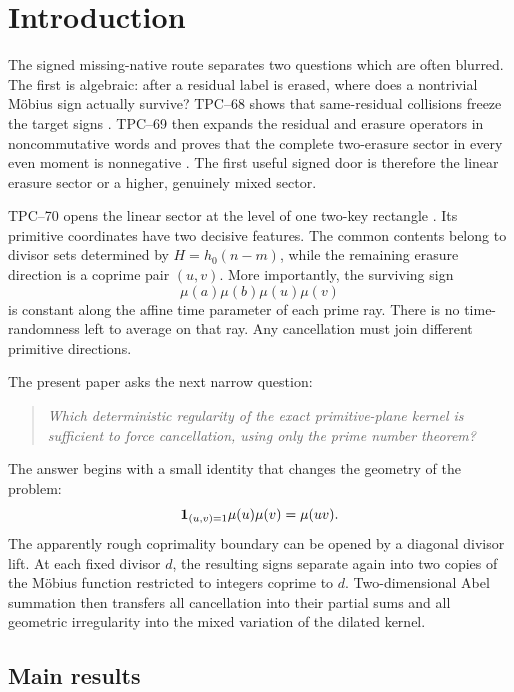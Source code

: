 \section{Introduction}
\label{sec:introduction}

The signed missing-native route separates two questions which are often
blurred.  The first is algebraic: after a residual label is erased, where
does a nontrivial M\"obius sign actually survive?  TPC--68 shows that
same-residual collisions freeze the target signs
\citep{WangTPC68}.  TPC--69 then expands the residual and erasure operators
in noncommutative words and proves that the complete two-erasure sector in
every even moment is nonnegative \citep{WangTPC69}.  The first useful signed
door is therefore the linear erasure sector or a higher, genuinely mixed
sector.

TPC--70 opens the linear sector at the level of one two-key rectangle
\citep{WangTPC70}.  Its primitive coordinates have two decisive features.
The common contents belong to divisor sets determined by
\(H=h_0(n-m)\), while the remaining erasure direction is a coprime pair
\((u,v)\).  More importantly, the surviving sign
\[
 \mu(a)\mu(b)\mu(u)\mu(v)
\]
is constant along the affine time parameter of each prime ray.  There is no
time-randomness left to average on that ray.  Any cancellation must join
different primitive directions.

The present paper asks the next narrow question:

\begin{quote}
\emph{Which deterministic regularity of the exact primitive-plane kernel is
sufficient to force cancellation, using only the prime number theorem?}
\end{quote}

The answer begins with a small identity that changes the geometry of the
problem:
\[
 \mathbf 1_{(u,v)=1}\mu(u)\mu(v)=\mu(uv).
\]
The apparently rough coprimality boundary can be opened by a diagonal
divisor lift.  At each fixed divisor \(d\), the resulting signs separate
again into two copies of the M\"obius function restricted to integers
coprime to \(d\).  Two-dimensional Abel summation then transfers all
cancellation into their partial sums and all geometric irregularity into
the mixed variation of the dilated kernel.

\subsection{Main results}

